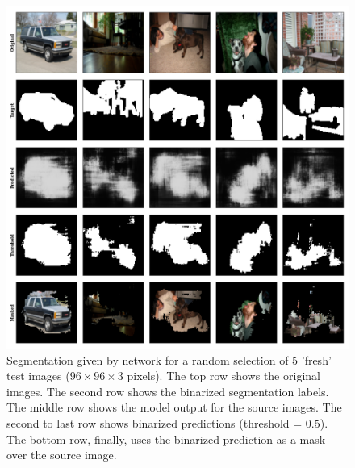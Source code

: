 \begin{figure}[!htbp]
  \begin{center}
    \includegraphics[width=\linewidth, keepaspectratio]{images/segm_prediction}
    \caption{Segmentation given by network for a random selection of 5 'fresh' test images ($96\times96\times3$ pixels). The top row shows the original images. The second row shows the binarized segmentation labels. The middle row shows the model output for the source images. The second to last row shows binarized predictions (threshold = $0.5$). The bottom row, finally, uses the binarized prediction as a mask over the source image.}
    \label{fig:segm_prediction}
  \end{center}
\end{figure}


